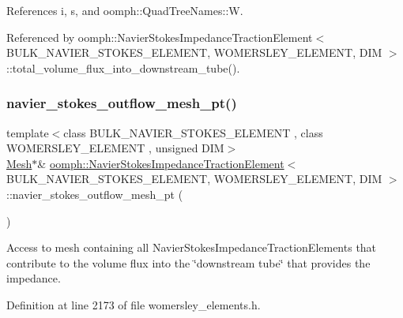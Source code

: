 References i, s, and oomph\+::\+Quad\+Tree\+Names\+::W.



Referenced by oomph\+::\+Navier\+Stokes\+Impedance\+Traction\+Element$<$ B\+U\+L\+K\+\_\+\+N\+A\+V\+I\+E\+R\+\_\+\+S\+T\+O\+K\+E\+S\+\_\+\+E\+L\+E\+M\+E\+N\+T, W\+O\+M\+E\+R\+S\+L\+E\+Y\+\_\+\+E\+L\+E\+M\+E\+N\+T, D\+I\+M $>$\+::total\+\_\+volume\+\_\+flux\+\_\+into\+\_\+downstream\+\_\+tube().

\mbox{\label{classoomph_1_1NavierStokesImpedanceTractionElement_a6ddd1fa5b0e8c498aa1fc03f4492ee34}} 
\subsubsection{\texorpdfstring{navier\+\_\+stokes\+\_\+outflow\+\_\+mesh\+\_\+pt()}{navier\_stokes\_outflow\_mesh\_pt()}}
{\footnotesize\ttfamily template$<$class B\+U\+L\+K\+\_\+\+N\+A\+V\+I\+E\+R\+\_\+\+S\+T\+O\+K\+E\+S\+\_\+\+E\+L\+E\+M\+E\+NT , class W\+O\+M\+E\+R\+S\+L\+E\+Y\+\_\+\+E\+L\+E\+M\+E\+NT , unsigned D\+IM$>$ \\
\hyperlink{classoomph_1_1Mesh}{Mesh}$\ast$\& \hyperlink{classoomph_1_1NavierStokesImpedanceTractionElement}{oomph\+::\+Navier\+Stokes\+Impedance\+Traction\+Element}$<$ B\+U\+L\+K\+\_\+\+N\+A\+V\+I\+E\+R\+\_\+\+S\+T\+O\+K\+E\+S\+\_\+\+E\+L\+E\+M\+E\+NT, W\+O\+M\+E\+R\+S\+L\+E\+Y\+\_\+\+E\+L\+E\+M\+E\+NT, D\+IM $>$\+::navier\+\_\+stokes\+\_\+outflow\+\_\+mesh\+\_\+pt (\begin{DoxyParamCaption}{ }\end{DoxyParamCaption})\hspace{0.3cm}{\ttfamily [inline]}}



Access to mesh containing all Navier\+Stokes\+Impedance\+Traction\+Elements that contribute to the volume flux into the \char`\"{}downstream tube\char`\"{} that provides the impedance. 



Definition at line 2173 of file womersley\+\_\+elements.\+h.

